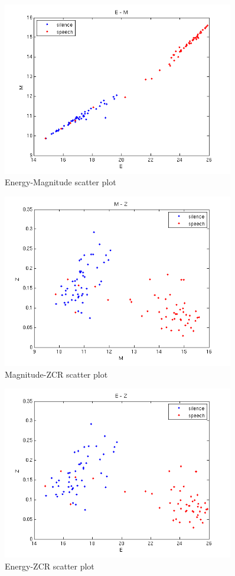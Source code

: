 \documentclass{article}
\begin{document}
\begin{figure}[h!]
  \centering
  \includegraphics[width=0.9\textwidth]{e-m}
  \caption{Energy-Magnitude scatter plot}
  \label{fig:e-m}
\end{figure}
\begin{figure}[h!]
  \centering
  \includegraphics[width=0.9\textwidth]{m-z}
  \caption{Magnitude-ZCR scatter plot}
  \label{fig:m-z}
\end{figure}
\begin{figure}[h!]
  \centering
  \includegraphics[width=0.9\textwidth]{e-z}
  \caption{Energy-ZCR scatter plot}
  \label{fig:e-z}
\end{figure} 
\end{document}
